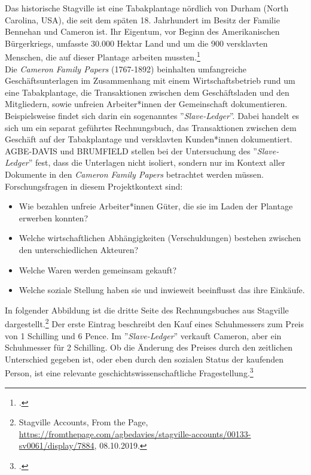 \documentclass[12pt,a4paper]{article}
\begin{document}
Das historische Stagville ist eine Tabakplantage nördlich von Durham (North Carolina, USA), die seit dem späten 18. Jahrhundert im Besitz der Familie Bennehan und Cameron ist. Ihr Eigentum, vor Beginn des Amerikanischen Bürgerkriegs, umfasste 30.000 Hektar Land und um die 900 versklavten Menschen, die auf dieser Plantage arbeiten mussten.\footcite[][]{brumfield2015medea}
\\
Die \textit{Cameron Family Papers} (1767-1892) beinhalten umfangreiche Geschäftsunterlagen im Zusammenhang mit einem Wirtschaftsbetrieb rund um eine Tabakplantage, die Transaktionen zwischen dem Geschäftsladen und den Mitgliedern, sowie unfreien Arbeiter*innen der Gemeinschaft dokumentieren. Beispielsweise findet sich darin ein sogenanntes ''\textit{Slave-Ledger}''. Dabei handelt es sich um ein separat geführtes Rechnungsbuch, das Transaktionen zwischen dem Geschäft auf der Tabakplantage und versklavten Kunden*innen dokumentiert.
\\
AGBE-DAVIS und BRUMFIELD stellen bei der Untersuchung des ''\textit{Slave-Ledger}'' fest, dass die Unterlagen nicht isoliert, sondern nur im Kontext aller Dokumente in den \textit{Cameron Family Papers} betrachtet werden müssen. Forschungsfragen in diesem Projektkontext sind:
\begin{itemize}
\item Wie bezahlen unfreie Arbeiter*innen Güter, die sie im Laden der Plantage erwerben konnten?
\item Welche wirtschaftlichen Abhängigkeiten (Verschuldungen) bestehen zwischen den unterschiedlichen Akteuren?
\item Welche Waren werden gemeinsam gekauft?
\item Welche soziale Stellung haben sie und inwieweit beeinflusst das ihre Einkäufe.
\end{itemize}
In folgender Abbildung ist die dritte Seite des Rechnungsbuches aus Stagville dargestellt.\footnote{Stagville Accounts, From the Page, \protect\url{https://fromthepage.com/agbedavies/stagville-accounts/00133-sv0061/display/7884}, 08.10.2019.} Der erste Eintrag beschreibt den Kauf eines Schuhmessers zum Preis von 1 Schilling und 6 Pence. Im ''\textit{Slave-Ledger}'' verkauft Cameron, aber ein Schuhmesser für 2 Schilling. Ob die Änderung des Preises durch den zeitlichen Unterschied gegeben ist, oder eben durch den sozialen Status der kaufenden Person, ist eine relevante geschichtswissenschaftliche Fragestellung.\footcite[][]{brumfield2019blog}
\end{document}
